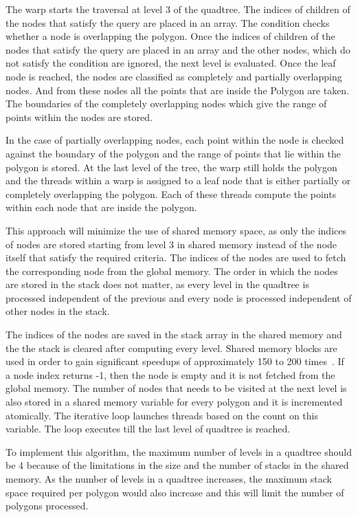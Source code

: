 The warp starts the traversal at level 3 of the quadtree. The indices of children of the nodes that satisfy the query are placed in an array. The condition checks whether a node is overlapping the polygon. Once the indices of children of the nodes that satisfy the query are placed in an array and the other nodes, which do not satisfy the condition are ignored, the next level is evaluated.
Once the leaf node is reached, the nodes are classified as completely and partially overlapping nodes. And from these nodes all the points that are inside the Polygon are taken. The boundaries of the completely overlapping nodes which give the range of points within the nodes are stored.

In the case of partially overlapping nodes, each point within the node is checked against the boundary of the polygon and the range of points that lie within the polygon is stored. At the last level of the tree, the warp still holds the polygon and the threads within a warp is assigned to a leaf node that is either partially or completely overlapping the polygon. Each of these threads compute the points within each node that are inside the polygon.

This approach will minimize the use of shared memory space, as only the indices of nodes are stored starting from level 3 in shared memory instead of the node itself that satisfy the required criteria. The indices of the nodes are used to fetch the corresponding node from the global memory.
The order in which the nodes are stored in the stack does not matter, as every level in the quadtree is processed independent of the previous and every node is processed independent of other nodes in the stack.

The indices of the nodes are saved in the stack array in the shared memory and the the stack is cleared after computing every level. Shared memory blocks are used in order to gain significant speedups of approximately 150 to 200 times~\cite{Kelly:gpu}. If a node index returns -1, then the node is empty and it is not fetched from the global memory.
The number of nodes that needs to be visited  at the next level is also stored in a shared memory variable for every polygon and it is incremented atomically. The iterative loop launches threads based on the count on this variable. The loop executes till the last level of quadtree is reached.

To implement this algorithm, the maximum number of levels in a quadtree should be 4 because of the limitations in the size and the number of stacks in the  shared memory. As the number of levels in a quadtree increases, the maximum stack space required per polygon would also increase and this will limit the number of polygons processed.

